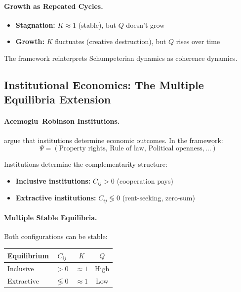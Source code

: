 \paragraph{Growth as Repeated Cycles.}
\begin{itemize}
  \item \textbf{Stagnation:} $K \approx 1$ (stable), but $Q$ doesn't grow
  \item \textbf{Growth:} $K$ fluctuates (creative destruction), but $Q$ rises over time
\end{itemize}

The framework reinterprets Schumpeterian dynamics as coherence dynamics.

\subsection{Institutional Economics: The Multiple Equilibria Extension}

\paragraph{Acemoglu--Robinson Institutions.}
\citet{acemoglu} argue that institutions determine economic outcomes.
In the framework:
\begin{equation}
  \Psi = (\text{Property rights, Rule of law, Political openness}, \ldots)
\end{equation}

Institutions determine the complementarity structure:
\begin{itemize}
  \item \textbf{Inclusive institutions:} $C_{ij} > 0$ (cooperation pays)
  \item \textbf{Extractive institutions:} $C_{ij} \lessgtr 0$ (rent-seeking, zero-sum)
\end{itemize}

\paragraph{Multiple Stable Equilibria.}
Both configurations can be stable:
\begin{center}
\renewcommand{\arraystretch}{1.2}
\begin{tabular}{lccc}
\hline
\textbf{Equilibrium} & $C_{ij}$ & $K$ & $Q$ \\
\hline
Inclusive & $> 0$ & $\approx 1$ & High \\
Extractive & $\lessgtr 0$ & $\approx 1$ & Low \\
\hline
\end{tabular}
\end{center}

